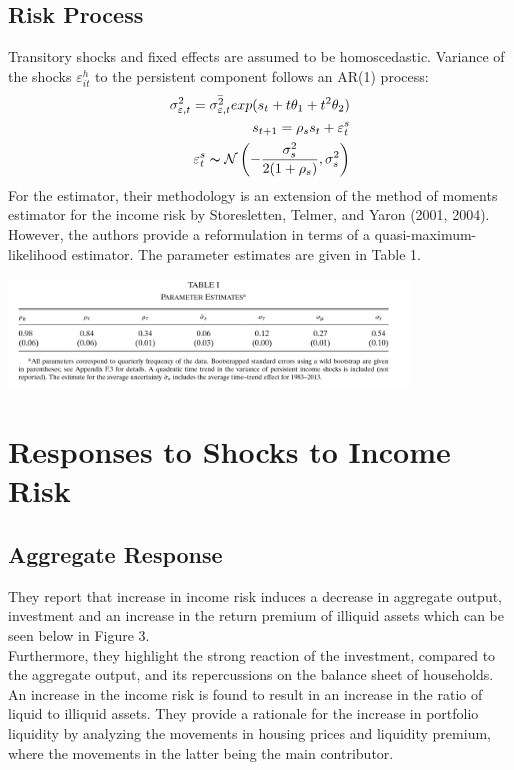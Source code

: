 \documentclass[titlepage]{\econtex}
\begin{document}
\hypertarget{Risk Process}{}
\subsection{Risk Process}

Transitory shocks and fixed effects are assumed to be homoscedastic. Variance of the shocks $\varepsilon_{it}^{h}$ to the persistent component follows an AR(1) process:\\
\begin{align}
    \sigma_{\varepsilon,t}^{2} = \bar{\sigma_{\varepsilon,t}^{2}}exp(s_{t}+t\theta_{1}+t^{2}\theta_{2})\\
    s_{t+1} =\rho_{s}s_{t}+ \varepsilon_{t}^{s}\\
  \varepsilon_{t}^{s} \thicksim \mathcal{N}\left(-\dfrac{\sigma_{s}^{2}}{2(1+\rho_{s})},\sigma_{s}^{2}\right)\\
  \end{align}
  For the estimator, their methodology is an extension of the method of moments estimator for the income risk by Storesletten, Telmer, and Yaron (2001, 2004). However, the authors provide a reformulation in terms of a quasi-maximum-likelihood estimator. The parameter estimates are given in Table 1.

  \begin{table}[H]
  \centering
    \includegraphics[width=0.8\textwidth]{Table1.png}
  \end{table}

\hypertarget{Responses to Shocks to Income Risk}{}
\section{Responses to Shocks to Income Risk}
  
\hypertarget{Aggregate Response}{}
\subsection{Aggregate Response}

They report that increase in income risk induces a decrease in aggregate output, investment and an increase in the return premium of illiquid assets which can be seen below in Figure 3.\\
Furthermore, they highlight the strong reaction of the investment, compared to the aggregate output, and its repercussions on the balance sheet of households. An increase in the income risk is found to result in an increase in the ratio of liquid to illiquid assets. They provide a rationale for the increase in portfolio liquidity by analyzing the movements in housing prices and liquidity premium, where the movements in the latter being the main contributor.
\end{document}
